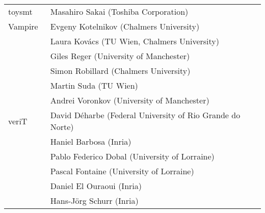 \begin{longtable}{lp{11.5cm}}
  toysmt
  & Masahiro Sakai (Toshiba Corporation)
  \\[1ex]

  Vampire~\cite{DBLP:conf/cav/KovacsV13}
  & Evgeny Kotelnikov (Chalmers University) \\
  & Laura Kov\'acs (TU Wien, Chalmers University) \\
  & Giles Reger (University of Manchester) \\
  & Simon Robillard (Chalmers University) \\
  & Martin Suda (TU Wien) \\
  & Andrei Voronkov (University of Manchester)
  \\[1ex]

  veriT~\cite{DBLP:conf/cade/BoutonODF09}
  & David D\'eharbe (Federal University of Rio Grande do Norte) \\
  & Haniel Barbosa (Inria) \\
  & Pablo Federico Dobal (University of Lorraine) \\
  & Pascal Fontaine (University of Lorraine) \\
  & Daniel El Ouraoui (Inria) \\
  & Hans-J\"org Schurr (Inria)
  \\[1ex]




\end{longtable}
